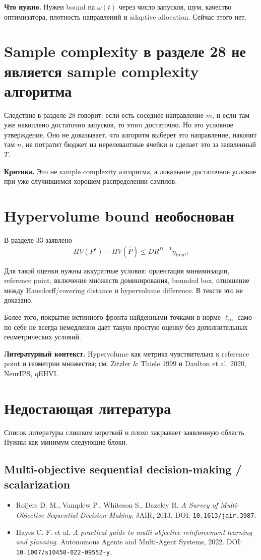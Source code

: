 \documentclass[11pt,a4paper]{article}
\begin{document}
\textbf{Что нужно.} Нужен bound на $\omega(t)$ через число запусков, шум, качество оптимизатора, плотность направлений и adaptive allocation. Сейчас этого нет.

\section{Sample complexity в разделе 28 не является sample complexity алгоритма}

Следствие в разделе 28 говорит: если есть соседнее направление $m$, и если там уже накоплено достаточно запусков, то этого достаточно. Но это условное утверждение. Оно не доказывает, что алгоритм выберет это направление, накопит там $n$, не потратит бюджет на нерелевантные ячейки и сделает это за заявленный $T$.

\textbf{Критика.} Это не sample complexity алгоритма, а локальное достаточное условие при уже случившемся хорошем распределении сэмплов.

\section{Hypervolume bound необоснован}

В разделе 33 заявлено
\[
HV(P^{\star})-HV(\hat P) \le D R^{D-1}\eta_{\mathrm{front}}.
\]

Для такой оценки нужны аккуратные условия: ориентация минимизации, reference point, включение множеств доминирования, bounded box, отношение между Hausdorff/covering distance и hypervolume difference. В тексте это не доказано.

Более того, покрытие истинного фронта найденными точками в норме $\ell_{\infty}$ само по себе не всегда немедленно дает такую простую оценку без дополнительных геометрических условий.

\textbf{Литературный контекст.} Hypervolume как метрика чувствительна к reference point и геометрии множества; см. Zitzler \& Thiele 1999 и Daulton et al. 2020, NeurIPS, qEHVI.

\section{Недостающая литература}

Список литературы слишком короткий и плохо закрывает заявленную область. Нужны как минимум следующие блоки.

\subsection*{Multi-objective sequential decision-making / scalarization}
\begin{itemize}
    \item Roijers D. M., Vamplew P., Whiteson S., Dazeley R. \emph{A Survey of Multi-Objective Sequential Decision-Making}. JAIR, 2013. DOI: \texttt{10.1613/jair.3987}.
    \item Hayes C. F. et al. \emph{A practical guide to multi-objective reinforcement learning and planning}. Autonomous Agents and Multi-Agent Systems, 2022. DOI: \texttt{10.1007/s10458-022-09552-y}.
\end{itemize}
\end{document}
